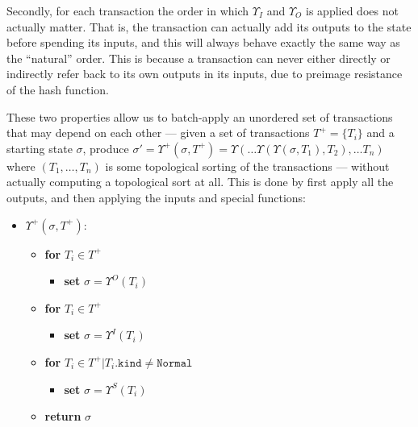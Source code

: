 \documentclass[
]{article}
\providecommand{\tightlist}{%
  \setlength{\itemsep}{0pt}\setlength{\parskip}{0pt}}
\begin{document}
Secondly, for each transaction the order in which \(\Upsilon_I\) and
\(\Upsilon_O\) is applied does not actually matter. That is, the
transaction can actually add its outputs to the state before spending
its inputs, and this will always behave exactly the same way as the
``natural'' order. This is because a transaction can never either
directly or indirectly refer back to its own outputs in its inputs, due
to preimage resistance of the hash function.

These two properties allow us to batch-apply an unordered set of
transactions that may depend on each other --- given a set of
transactions \(T^{+}=\{T_i\}\) and a starting state \(\sigma\), produce
\(\sigma' = \Upsilon^+(\sigma, T^+) = \Upsilon(\dots\Upsilon(\Upsilon(\sigma, T_1), T_2), \dots T_n)\)
where \((T_1,\dots,T_n)\) is some topological sorting of the
transactions --- without actually computing a topological sort at all.
This is done by first apply all the outputs, and then applying the
inputs and special functions:

\begin{itemize}
  \tightlist
  \item
        \(\Upsilon^+(\sigma, T^+)\):

        \begin{itemize}
          \tightlist
          \item
                \textbf{for} \(T_i \in T^+\)

                \begin{itemize}
                  \tightlist
                  \item
                        \textbf{set} \(\sigma= \Upsilon^O(T_i)\)
                \end{itemize}
          \item
                \textbf{for} \(T_i \in T^+\)

                \begin{itemize}
                  \tightlist
                  \item
                        \textbf{set} \(\sigma= \Upsilon^I(T_i)\)
                \end{itemize}
          \item
                \textbf{for}
                \(T_i \in T^+ | T_i.\mathtt{kind} \neq \mathtt{Normal}\)

                \begin{itemize}
                  \tightlist
                  \item
                        \textbf{set} \(\sigma= \Upsilon^S(T_i)\)
                \end{itemize}
          \item
                \textbf{return} \(\sigma\)
        \end{itemize}
\end{itemize}
\end{document}
